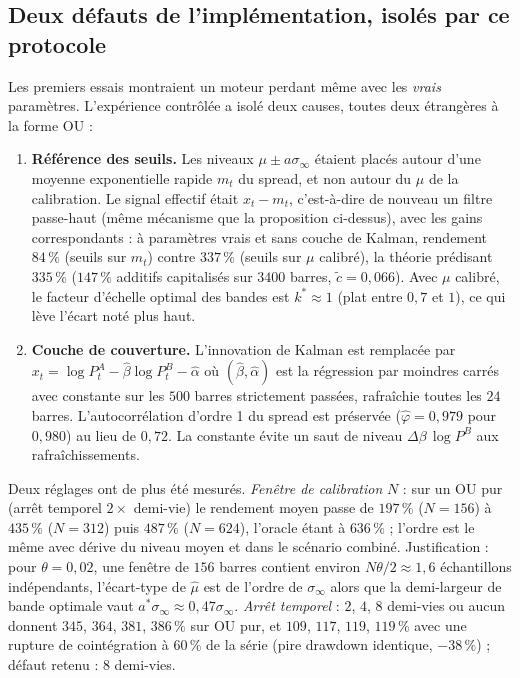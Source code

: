 \documentclass[11pt,a4paper]{article}
\theoremstyle{definition}
\theoremstyle{remark}
\newcommand{\sinf}{\sigma_\infty}
\begin{document}
\subsection{Deux défauts de l'implémentation, isolés par ce protocole}

Les premiers essais montraient un moteur perdant même avec les \emph{vrais} paramètres. L'expérience contrôlée a isolé deux causes, toutes deux étrangères à la forme OU :

\begin{enumerate}[nosep]
\item \textbf{Référence des seuils.} Les niveaux $\mu\pm a\sinf$ étaient placés autour d'une moyenne exponentielle rapide $m_t$ du spread, et non autour du $\mu$ de la calibration. Le signal effectif était
$x_t-m_t$, c'est-à-dire de nouveau un filtre passe-haut (même mécanisme que la proposition ci-dessus), avec les gains correspondants :
à paramètres vrais et sans couche de Kalman, rendement $84\,\%$ (seuils sur $m_t$) contre $337\,\%$ (seuils sur $\mu$ calibré), la théorie prédisant $335\,\%$
($147\,\%$ additifs capitalisés sur $3400$ barres, $\tilde c=0{,}066$). Avec $\mu$ calibré, le facteur d'échelle optimal des bandes est $k^*\approx1$ (plat entre $0{,}7$ et $1$), ce qui lève l'écart noté plus haut.
\item \textbf{Couche de couverture.} L'innovation de Kalman est remplacée par $x_t=\log P^A_t-\hat\beta\log P^B_t-\hat\alpha$ où $(\hat\beta,\hat\alpha)$ est la régression par moindres carrés avec constante sur les $500$ barres
strictement passées, rafraîchie toutes les $24$ barres. L'autocorrélation d'ordre 1 du spread est préservée ($\hat\varphi=0{,}979$ pour $0{,}980$) au lieu de $0{,}72$.
La constante évite un saut de niveau $\Delta\beta\,\log P^B$ aux rafraîchissements.
\end{enumerate}

Deux réglages ont de plus été mesurés. \emph{Fenêtre de calibration} $N$ : sur un OU pur (arrêt temporel $2\times$ demi-vie) le rendement moyen passe de $197\,\%$ ($N=156$) à $435\,\%$ ($N=312$) puis $487\,\%$ ($N=624$), l'oracle étant à $636\,\%$ ;
l'ordre est le même avec dérive du niveau moyen et dans le scénario combiné. Justification : pour $\theta=0{,}02$, une fenêtre de $156$ barres contient environ $N\theta/2\approx1{,}6$ échantillons indépendants, l'écart-type de $\hat\mu$ est de l'ordre de $\sinf$ alors que la demi-largeur de bande optimale vaut $a^*\sinf\approx0{,}47\sinf$.
\emph{Arrêt temporel} : $2$, $4$, $8$ demi-vies ou aucun donnent $345$, $364$, $381$, $386\,\%$ sur OU pur, et $109$, $117$, $119$, $119\,\%$ avec une rupture de cointégration à $60\,\%$ de la série (pire drawdown identique, $-38\,\%$) ; défaut retenu : $8$ demi-vies.
\end{document}
